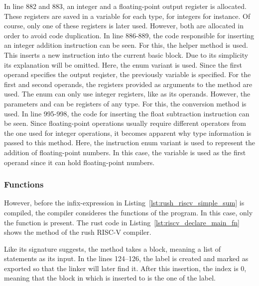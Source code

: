 In line 882 and 883, an integer and a floating-point output register is allocated.
These registers are saved in a variable for each type,  for integers for instance.
Of course, only one of these registers is later used.
However, both are allocated in order to avoid code duplication.
In line 886-889, the code responsible for inserting an integer addition instruction can be seen.
For this, the  helper method is used.
This inserts a new instruction into the current basic block.
Due to its simplicity its explanation will be omitted.
Here, the  enum variant is used.
Since the first operand specifies the output reqister, the previously  variable is specified.
For the first and second operands, the registers provided as arguments to the  method are used.
The  enum can only use integer registers, like  as its operands.
However, the parameters  and  can be registers of any type.
For this, the conversion method  is used.
In line 995-998, the code for inserting the float subtraction instruction can be seen.
Since floating-point operations usually require different operators from the one used for integer operations,
it becomes apparent why type information is passed to this method.
Here, the  instruction enum variant is used to represent the addition of floating-point numbers.
In this case, the variable  is used as the first operand since it can hold floating-point numbers.

\subsubsection{Functions}

However, before the infix-expression in Listing~\ref{lst:rush_riscv_simple_sum} is compiled,
the compiler consideres the functions of the program.
In this case, only the  function is present.
The rust code in Listing~\ref{lst:riscv_declare_main_fn} shows the  method of the rush RISC-V compiler.


Like its signature suggests, the method takes a block, meaning a list of statements as its input.
In the lines 124--126, the  label is created and marked as exported so that the linker will later find it.
After this insertion, the  index is 0, meaning that the block in which is inserted to is the one of the  label.

